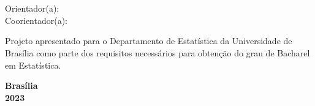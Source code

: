 \thispagestyle{empty}

\begin{center}
\textbf{\autor} \\
\vspace{5cm}
\textbf{\titulo} \\
\vspace{3cm}
\small
Orientador(a): \orientador \\
Coorientador(a): \coorientador
\end{center}


\vspace*{3cm}

\begin{flushright}
\begin{minipage}{7.5cm}
 \parbox[t]{7.5cm}{Projeto apresentado para o Departamento de Estatística da Universidade de Brasília como parte dos requisitos necessários para obtenção do grau de Bacharel em Estatística.}
\end{minipage}
\end{flushright}

\vspace{5cm}

\begin{center}
{\bf{Brasília} \\ }
\bf{2023}
\end{center}
